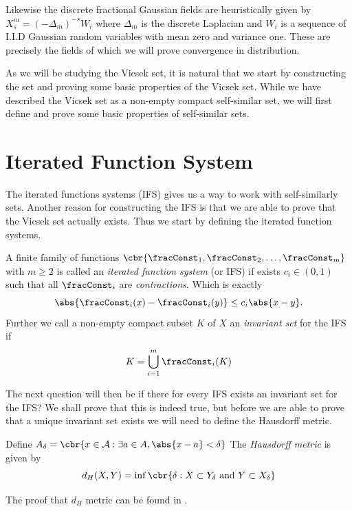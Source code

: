 Likewise the discrete fractional Gaussian fields are heuristically given by $X_{s}^{m} = (-\Delta_m)^{-s}W_i$ where $\Delta_m$ is the discrete Laplacian and $W_i$ is a sequence of I.I.D Gaussian random variables with mean zero and variance one. These are precisely the fields of which we will prove convergence in distribution.

As we will be studying the Vicsek set, it is natural that we start by constructing the set and proving some basic properties of the Vicsek set. While we have described the Vicsek set as a non-empty compact self-similar set, we will first define and prove some basic properties of self-similar sets.

\section{Iterated Function System}
The iterated functions systems (IFS) gives us a way to work with self-similarly sets. Another reason for constructing the IFS is that we are able to prove that the Vicsek set actually exists. Thus we start by defining the iterated function systems.

\begin{defi}
	A finite family of functions $\cbr{\fracConst_1, \fracConst_2, \ldots, \fracConst_m}$ with $m \geq 2$ is called an \emph{iterated function system} (or IFS) if exists $c_i \in (0, 1)$ such that all $\fracConst_i$ are \emph{contractions}. Which is exactly
	\begin{equation}
		\abs{\fracConst_i(x) -\fracConst_i(y)} \leq c_i \abs{x-y}.
	\end{equation}
	Further we call a non-empty compact subset $K$ of $X$ an \emph{invariant set} for the IFS if
	\begin{equation}\label{invariantSet}
		K = \bigcup_{i = 1}^{m} \fracConst_i(K)
	\end{equation}
\end{defi}


The next question will then be if there for every IFS exists an invariant set for the IFS? We shall prove that this is indeed true, but before we are able to prove that a unique invariant set exists we will need to define the Hausdorff metric.
\begin{defi}
	Define $A_{\delta} = \cbr{x \in \mathcal{A} : \exists a \in A, \abs{x-a} < \delta }$ 
	The \emph{Hausdorff metric} is given by
	\begin{equation}
		d_H(X,Y) = \inf \cbr{\delta : X \subset Y_\delta \text{ and } Y \subset X_\delta}
	\end{equation}
\end{defi}
The proof that $d_H$ metric can be found in \cite{Henrikson1999CompletenessAT}.


